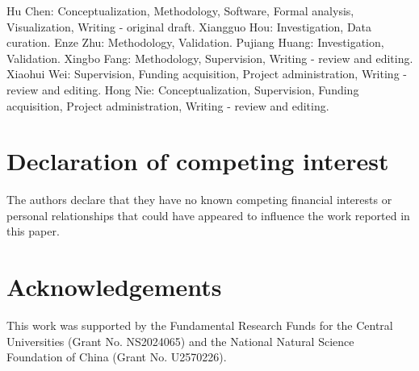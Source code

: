 \documentclass[preprint,12pt]{elsarticle}
\begin{document}
Hu Chen: Conceptualization, Methodology, Software, Formal analysis, Visualization, Writing - original draft. Xiangguo Hou: Investigation, Data curation. Enze Zhu: Methodology, Validation. Pujiang Huang: Investigation, Validation. Xingbo Fang: Methodology, Supervision, Writing - review and editing. Xiaohui Wei: Supervision, Funding acquisition, Project administration, Writing - review and editing. Hong Nie: Conceptualization, Supervision, Funding acquisition, Project administration, Writing - review and editing.

\section*{Declaration of competing interest}

The authors declare that they have no known competing financial interests or personal relationships that could have appeared to influence the work reported in this paper.

\section*{Acknowledgements}

This work was supported by the Fundamental Research Funds for the Central Universities (Grant No. NS2024065) and the National Natural Science Foundation of China (Grant No. U2570226).




\end{document}
